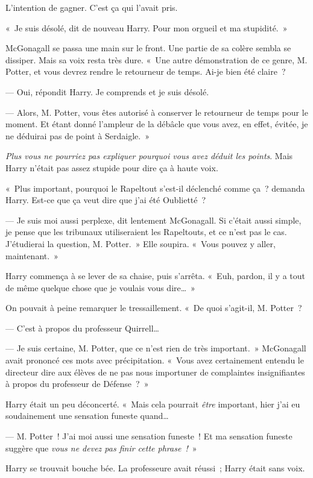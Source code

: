 L'intention de gagner.
C'est ça qui l'avait pris.

«~Je suis désolé, dit de nouveau Harry.
Pour mon orgueil et ma stupidité.~»

McGonagall se passa une main sur le front.
Une partie de sa colère sembla se dissiper.
Mais sa voix resta très dure.
«~Une autre démonstration de ce genre, M. Potter, et vous devrez rendre le retourneur de temps.
Ai-je bien été claire~?

--- Oui, répondit Harry.
Je comprends et je suis désolé.

--- Alors, M. Potter, vous êtes autorisé à conserver le retourneur de temps pour le moment.
Et étant donné l'ampleur de la débâcle que vous avez, en effet, évitée, je ne déduirai pas de point à Serdaigle.~»

\emph{Plus vous ne pourriez pas expliquer pourquoi vous avez déduit les points}.
Mais Harry n'était pas assez stupide pour dire ça à haute voix.

«~Plus important, pourquoi le Rapeltout s'est-il déclenché comme ça~? demanda Harry.
Est-ce que ça veut dire que j'ai été Oublietté~?

--- Je suis moi aussi perplexe, dit lentement McGonagall.
Si c'était aussi simple, je pense que les tribunaux utiliseraient les Rapeltouts, et ce n'est pas le cas.
J'étudierai la question, M. Potter.~»
Elle soupira.
«~Vous pouvez y aller, maintenant.~»

Harry commença à se lever de sa chaise, puis s'arrêta.
«~Euh, pardon, il y a tout de même quelque chose que je voulais vous dire…~»

On pouvait à peine remarquer le tressaillement.
«~De quoi s'agit-il, M. Potter~?

--- C'est à propos du professeur Quirrell…

--- Je suis certaine, M. Potter, que ce n'est rien de très important.~»
McGonagall avait prononcé ces mots avec précipitation.
«~Vous avez certainement entendu le directeur dire aux élèves de ne pas nous importuner de complaintes insignifiantes à propos du professeur de Défense~?~»

Harry était un peu déconcerté.
«~Mais cela pourrait \emph{être} important, hier j'ai eu soudainement une sensation funeste quand…

--- M. Potter~!
J'ai moi aussi une sensation funeste~!
Et ma sensation funeste suggère que \emph{vous ne devez pas finir cette phrase~!}~»

Harry se trouvait bouche bée.
La professeure avait réussi~; Harry était sans voix.

